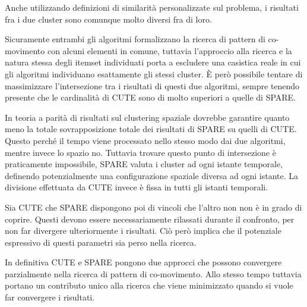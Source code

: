 Anche utilizzando definizioni di similarità personalizzate sul problema, i risultati fra i due cluster sono comunque molto diversi fra di loro.

Sicuramente entrambi gli algoritmi formalizzano la ricerca di pattern di co-movimento con alcuni elementi in comune, tuttavia l'approccio alla ricerca e la natura stessa degli itemset individuati porta a escludere una casistica reale in cui gli algoritmi individuano esattamente gli stessi cluster.
È però possibile tentare di massimizzare l'intersezione tra i risultati di questi due algoritmi, sempre tenendo presente che le cardinalità di CUTE sono di molto superiori a quelle di SPARE.

In teoria a parità di risultati sul clustering spaziale dovrebbe garantire quanto meno la totale sovrapposizione totale dei risultati di SPARE su quelli di CUTE.
Questo perché il tempo viene processato nello stesso modo dai due algoritmi, mentre invece lo spazio no.
Tuttavia trovare questo punto di intersezione è praticamente impossibile, SPARE valuta i cluster ad ogni istante temporale, definendo potenzialmente una configurazione spaziale diversa ad ogni istante.
La divisione effettuata da CUTE invece è fissa in tutti gli istanti temporali.

Sia CUTE che SPARE dispongono poi di vincoli che l'altro non non è in grado di coprire.
Questi devono essere necessariamente rilassati durante il confronto, per non far divergere ulteriormente i risultati.
Ciò però implica che il potenziale espressivo di questi parametri sia perso nella ricerca.

In definitiva CUTE e SPARE pongono due approcci che possono convergere parzialmente nella ricerca di pattern di co-movimento.
Allo stesso tempo tuttavia portano un contributo unico alla ricerca che viene minimizzato quando si vuole far convergere i risultati.